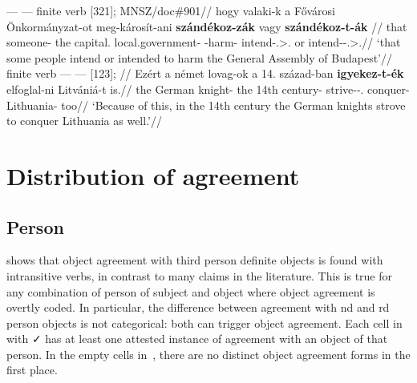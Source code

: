 \ex\label{ex:szandek-bp}
    \begingl
    \glpreamble \Obj{} --- \Inf{} --- finite verb [321]; \gls{MNSZ}/doc\#901//
        \gla 	\nogloss{\dots{}} hogy valaki-k a Fővárosi Önkormányzat-ot meg-károsít-ani \textbf{szándékoz-zák} vagy \textbf{szándékoz-t-ák} //
        \glb 	that someone-\Pl{} the capital.\Adj{} local.government-\Acc{} \Vm-harm-\Inf{} intend-\Tpl.\Sbj{}>\Third.\Obj{} or intend-\Pst-\Tpl.\Sbj{}>\Third.\Obj{}//
        \glft 	\enquote*{that some people intend or intended to harm the General Assembly of Budapest}//
    \endgl
\xe
\ex\label{ex:lovag-igyek}
    \begingl
        \glpreamble finite verb --- \Inf{} --- \Obj{} [123]; //
        \gla 	Ezért a német lovag-ok a 14. század-ban \textbf{igyekez-t-ék} elfoglal-ni Litvániá-t is.//
         the German knight-\Pl{} the 14th century-\Ine{} strive-\Pst-\Tpl.\Obj{} conquer-\Inf{} Lithuania-\Acc{} too//
        \glft 	\enquote*{Because of this, in the 14th century the German knights strove to conquer Lithuania as well.}\trailingcitation{}//
    \endgl
\xe

\section{Distribution of agreement}\label{sec:distribution-of-agreement}

\subsection{Person}

 shows that object agreement with third person definite
objects is found with intransitive verbs, in contrast to many claims in the
literature. This is true for any combination of person of subject and object
where object agreement is overtly coded. In particular, the difference between
agreement with \Second{}nd and \Third{}rd person objects is not
categorical: both can trigger object agreement.
%
Each cell in~ with \faCheck{} has at least one attested
instance of agreement with an object of that person. In the empty cells
in~, there are no distinct object agreement forms in the
first place.

